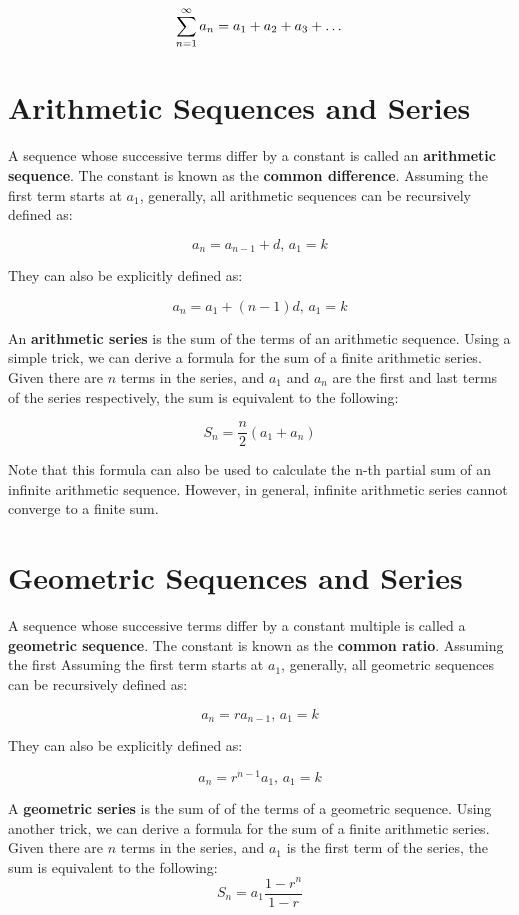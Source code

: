 \documentclass[11pt]{article}
\begin{document}
\[ \sum_{n=1}^{\infty} a_n = a_1 + a_2 + a_3 + \text{\dots} \]

\section{Arithmetic Sequences and Series}
A sequence whose successive terms differ by a constant is called an \textbf{arithmetic sequence}. The constant is known as the \textbf{common difference}. Assuming the first term starts at $a_1$, generally, all arithmetic sequences can be recursively defined as:

\[ a_n = a_{n-1}+d\text{, }a_1 = k\]

They can also be explicitly defined as:

\[ a_n = a_1+(n-1)d\text{, }a_1 = k \]


An \textbf{arithmetic series} is the sum of the terms of an arithmetic sequence. Using a simple trick, we can derive a formula for the sum of a finite arithmetic series. Given there are $n$ terms in the series, and $a_1$ and $a_n$ are the first and last terms of the series respectively, the sum is equivalent to the following:

\[ S_n = \frac{n}{2}(a_1+a_n) \]

Note that this formula can also be used to calculate the n-th partial sum of an infinite arithmetic sequence. However, in general, infinite arithmetic series cannot converge to a finite sum.


\section{Geometric Sequences and Series}
A sequence whose successive terms differ by a constant multiple is called a \textbf{geometric sequence}. The constant is known as the \textbf{common ratio}. Assuming the first Assuming the first term starts at $a_1$, generally, all geometric sequences can be recursively defined as:

\[ a_n = ra_{n-1}\text{, }a_1 = k\]

They can also be explicitly defined as:

\[ a_n = r^{n-1}a_1\text{, }a_1 = k \]

A \textbf{geometric series} is the sum of of the terms of a geometric sequence. Using another trick, we can derive a formula for the sum of a finite arithmetic series. Given there are $n$ terms in the series, and $a_1$ is the first term of the series, the sum is equivalent to the following:
\[ S_n = a_1 \frac{1-r^n}{1-r}\]
\end{document}
